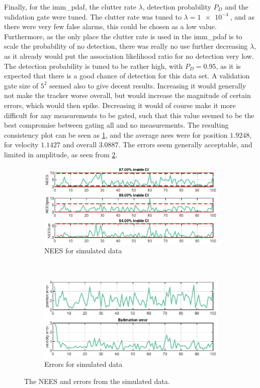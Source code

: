 Finally, for the \acrshort{imm_pdaf}, the clutter rate $\lambda$, detection probability $P_D$ and the validation gate were tuned. The clutter rate was tuned to $\lambda = \SI{1e-4}{}$, and as there were very few false alarms, this could be chosen as a low value. Furthermore, as the only place the clutter rate is used in the \acrshort{imm_pdaf} is to scale the probability of no detection, there was really no use further decreasing $\lambda$, as it already would put the association likelihood ratio for no detection very low. The detection probability is tuned to be rather high, with $P_D = 0.95$, as it is expected that there is a good chance of detection for this data set. A validation gate size of $5^2$ seemed also to give decent results. Increasing it would generally not make the tracker worse overall, but would increase the magnitude of certain errors, which would then spike. Decreasing it would of course make it more difficult for any measurements to be gated, such that this value seemed to be the best compromise between gating all and no measurements. The resulting consistency plot can be seen as \cref{fig:ga_1_2_NEES}, and the average \acrshort{nees} were for position $1.9248$, for velocity $1.1427$ and overall $3.0887$. The errors seem generally acceptable, and limited in amplitude, as seen from \cref{fig:ga_1_2_error}. 

\begin{figure}[ht]
    \centering
	\begin{subfigure}[h]{0.4\textwidth}
		\includegraphics[width=\textwidth]{figures/ga_1/2_NEES}
		\caption{NEES for simulated data}
		\label{fig:ga_1_2_NEES}
    \end{subfigure}%
    ~
    \begin{subfigure}[h]{0.4\textwidth}
        \includegraphics[width=\textwidth]{figures/ga_1/2_error}
        \caption{Errors for simulated data}
        \label{fig:ga_1_2_error}
    \end{subfigure}
    \caption{The NEES and errors from the simulated data. }
    \label{fig:ga_1_2_NEES_and_error} 
\end{figure}

